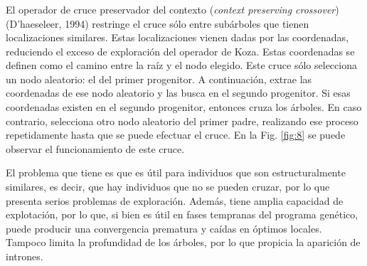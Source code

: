 \documentclass[spanish,a4paper,12pt,twoside]{report}
\begin{document}
        \subsubsection*{\vspace{-0.5cm}{\normalsize Operador de cruce preservador del contexto}}
        \vspace{-0.5cm}
        El operador de cruce preservador del contexto (\emph{context preserving crossover}) (D'haeseleer, 1994) restringe el cruce sólo entre subárboles que tienen localizaciones similares. Estas localizaciones vienen dadas por las coordenadas, reduciendo el exceso de exploración del operador de Koza. Estas coordenadas se definen como el camino entre la raíz y el nodo elegido. Este cruce sólo selecciona un nodo aleatorio: el del primer progenitor. A continuación, extrae las coordenadas de ese nodo aleatorio y las busca en el segundo progenitor. Si esas coordenadas existen en el segundo progenitor, entonces cruza los árboles. En caso contrario, selecciona otro nodo aleatorio del primer padre, realizando ese proceso repetidamente hasta que se puede efectuar el cruce. En la Fig. \ref{fig:8} se puede observar el funcionamiento de este cruce. \par
        El problema que tiene es que es útil para individuos que son estructuralmente similares, es decir, que hay individuos que no se pueden cruzar, por lo que presenta serios problemas de exploración. Además, tiene amplia capacidad de explotación, por lo que, si bien es útil en fases tempranas del programa genético, puede producir una convergencia prematura y caídas en óptimos locales. Tampoco limita la profundidad de los árboles, por lo que propicia la aparición de intrones.
        
\end{document}
